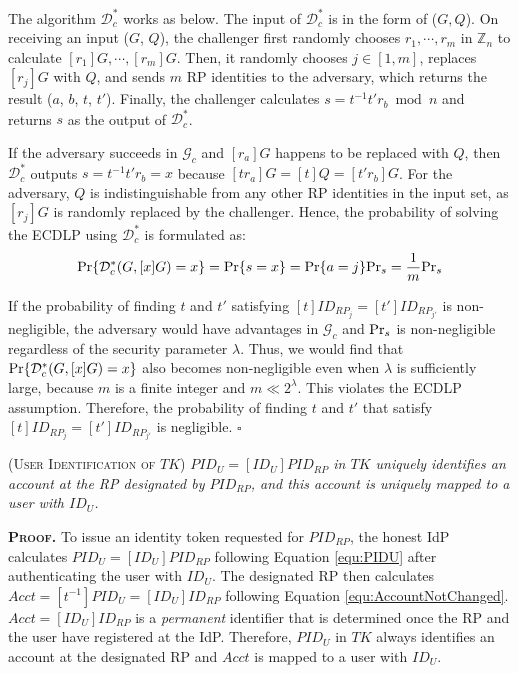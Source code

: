 The algorithm $\mathcal{D}^*_c$ works as below.
The input of $\mathcal{D}^*_c$ is in the form of ($G, Q$). On receiving an input ($G$, $Q$), the challenger first randomly chooses $r_1, \cdots, r_m$ in $\mathbb{Z}_n$ to calculate $[r_1]G, \cdots, [r_m]G$.
Then, it randomly chooses $j \in [1,m]$, replaces $[r_j]G$ with $Q$, and sends $m$ RP identities to the adversary, which returns the result ($a$, $b$, $t$, $t'$). Finally, the challenger calculates $s = t^{-1}t'r_b \bmod n$ and returns $s$ as the output of $\mathcal{D}^*_c$.

If the adversary succeeds in $\mathcal{G}_c$ and $[r_a]G$ happens to be replaced with $Q$, then $\mathcal{D}^*_c$ outputs $s=t^{-1}t'r_b =x$ because $[tr_a]G = [t]Q = [t'r_b]G$. For the adversary, $Q$ is indistinguishable from any other RP identities in the input set, as $[r_j]G$ is randomly replaced by the challenger.
Hence, the probability of solving the ECDLP using $\mathcal{D}^*_c$ is formulated as:
\begin{equation*}
{\rm Pr}\{\mathcal{D}^*_c(G, [x]G)=x\} = {\rm Pr}\{s = x\}={\rm Pr}\{a=j\}{\rm Pr}_s=\frac{1}{m}{\rm Pr}_s
\end{equation*}

If the probability of finding $t$ and $t'$ satisfying $[t]ID_{RP_j} = [t']ID_{RP_{j'}}$ is non-negligible, the adversary would have advantages  in $\mathcal{G}_c$ and ${\rm Pr}_s$ is non-negligible regardless of the security parameter $\lambda$.
Thus, we would find that ${\rm Pr}\{\mathcal{D}^*_c(G, [x]G)=x\}$ also becomes non-negligible even when $\lambda$ is sufficiently large, because $m$ is a finite integer and $m \ll 2^\lambda$.
\oldc
This violates the ECDLP assumption. Therefore, the probability of finding $t$ and $t'$ that satisfy $[t]ID_{RP_j} = [t']ID_{RP_{j'}}$ is negligible. \hfill $\square$


\newc

\begin{thm}
\textsc{(User Identification of $TK$)} \emph{$PID_U= [ID_U]PID_{RP}$ in $TK$ uniquely identifies an account at the RP designated by $PID_{RP}$, and this account is uniquely mapped to a user with $ID_U$.}
\label{thm-user-id}
\end{thm}

\noindent\textbf{\textsc{Proof.}}
To issue an identity token requested for $PID_{RP}$, the honest IdP calculates $PID_U = [ID_U]PID_{RP}$ following Equation \ref{equ:PIDU} after authenticating the user with $ID_U$. The designated RP then calculates $Acct = [t^{-1}]PID_{U} = [ID_U]ID_{RP}$ following Equation \ref{equ:AccountNotChanged}.
$Acct = [ID_U]ID_{RP}$ is a \emph{permanent} identifier that is determined once the RP and the user have registered at the IdP. Therefore, $PID_U$ in $TK$ always identifies an account at the designated RP and $Acct$ is mapped to a user with $ID_U$.

